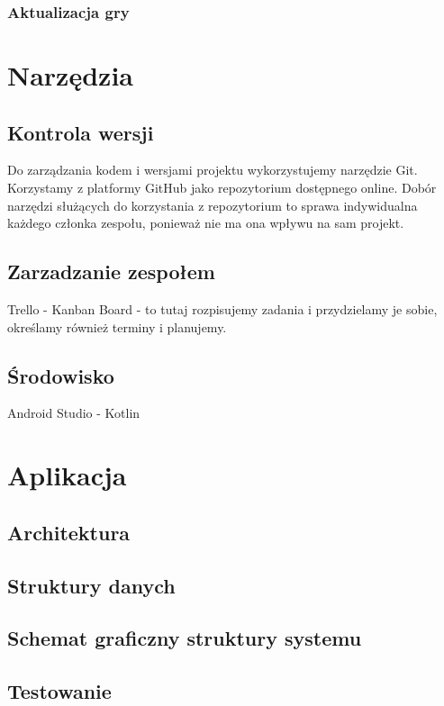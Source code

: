 \documentclass[12pt,a4paper]{article}
\begin{document}
\subsubsection{Aktualizacja gry}

\section{Narzędzia}
\subsection{Kontrola wersji}
Do zarządzania kodem i wersjami projektu wykorzystujemy narzędzie Git. Korzystamy z platformy GitHub jako repozytorium dostępnego online. Dobór narzędzi służących do korzystania z repozytorium to sprawa indywidualna każdego członka zespołu, ponieważ nie ma ona wpływu na sam projekt.

\subsection{Zarzadzanie zespołem}
Trello - Kanban Board - to tutaj rozpisujemy zadania i przydzielamy je sobie, określamy również terminy i planujemy.\\


\subsection{Środowisko}
Android Studio - Kotlin \\
\section{Aplikacja}
\subsection{Architektura}

\subsection{Struktury danych}

\subsection{Schemat graficzny struktury systemu}
\subsection{Testowanie}
\end{document}
